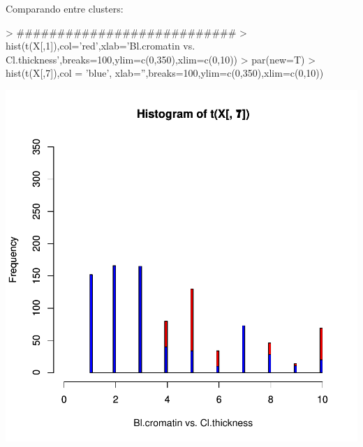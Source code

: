 \documentclass{article}
\begin{document}
Comparando entre clusters:
\begin{Schunk}
\begin{Sinput}
> ###########################
> hist(t(X[,1]),col='red',xlab='Bl.cromatin vs. Cl.thickness',breaks=100,ylim=c(0,350),xlim=c(0,10))
> par(new=T)
> hist(t(X[,7]),col = 'blue', xlab='',breaks=100,ylim=c(0,350),xlim=c(0,10))
\end{Sinput}
\end{Schunk}
\includegraphics{selecao-013}
\end{document}
